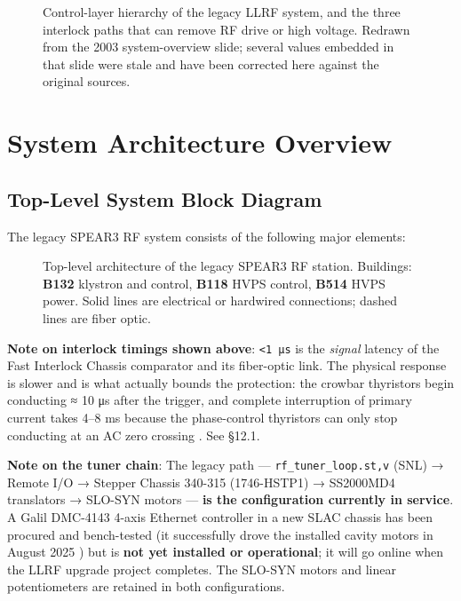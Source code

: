 \begin{figure}[tbp]\centering
\begin{fitpicture}\end{fitpicture}
\caption{Control-layer hierarchy of the legacy LLRF system, and the three
  interlock paths that can remove RF drive or high voltage.  Redrawn from the
  2003 system-overview slide; several values embedded in that slide were stale
  and have been corrected here against the original sources.}
\label{fig:legacy-architecture}
\end{figure}



\section{System Architecture Overview}

\subsection{Top-Level System Block Diagram}

The legacy SPEAR3 RF system consists of the following major elements:

\begin{figure}[p]
\centering
\begin{fitpicture}\end{fitpicture}
\caption{Top-level architecture of the legacy SPEAR3 RF station.  Buildings:
  \textbf{B132} klystron and control, \textbf{B118} HVPS control,
  \textbf{B514} HVPS power.  Solid lines are electrical or hardwired
  connections; dashed lines are fiber optic.}\label{fig:system-overview}
\end{figure}

\begin{keynote}
\textbf{Note on interlock timings shown above}: \texttt{\textless{}1\ μs} is the \emph{signal} latency of the Fast Interlock Chassis comparator and its fiber-optic link. The physical response is slower and is what actually bounds the protection: the crowbar thyristors begin conducting ≈ 10 μs after the trigger, and complete interruption of primary current takes 4--8 ms because the phase-control thyristors can only stop conducting at an AC zero crossing . See §12.1.

\textbf{Note on the tuner chain}: The legacy path --- \texttt{rf\_tuner\_loop.st,v} (SNL) → Remote I/O → Stepper Chassis 340-315 (1746-HSTP1) → SS2000MD4 translators → SLO-SYN motors --- \textbf{is the configuration currently in service}. A Galil DMC-4143 4-axis Ethernet controller in a new SLAC chassis has been procured and bench-tested (it successfully drove the installed cavity motors in August 2025 ) but is \textbf{not yet installed or operational}; it will go online when the LLRF upgrade project completes. The SLO-SYN motors and linear potentiometers are retained in both configurations.
\end{keynote}


